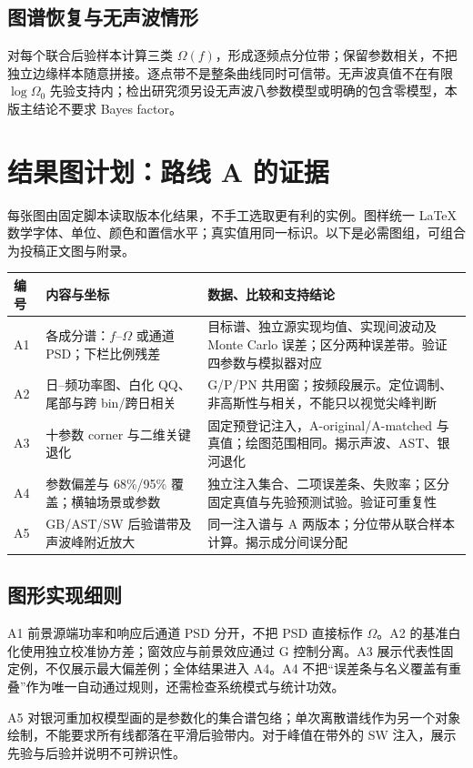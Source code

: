 \documentclass[UTF8,fontset=none,a4paper,11pt]{ctexart}
\newcommand{\chapterpage}[1]{\section{#1}}
\begin{document}
\subsection{图谱恢复与无声波情形}
对每个联合后验样本计算三类 $\Omega(f)$，形成逐频点分位带；保留参数相关，不把独立边缘样本随意拼接。逐点带不是整条曲线同时可信带。无声波真值不在有限 $\log\Omega_0$ 先验支持内；检出研究须另设无声波八参数模型或明确的包含零模型，本版主结论不要求 Bayes factor。
\chapterpage{结果图计划：路线 A 的证据}
每张图由固定脚本读取版本化结果，不手工选取更有利的实例。图样统一 LaTeX 数学字体、单位、颜色和置信水平；真实值用同一标识。以下是必需图组，可组合为投稿正文图与附录。
\begin{longtable}{p{12mm}p{58mm}p{75mm}}\toprule
编号 & 内容与坐标 & 数据、比较和支持结论\\\midrule\endhead
A1 & 各成分谱：$f$--$\Omega$ 或通道 PSD；下栏比例残差 & 目标谱、独立源实现均值、实现间波动及 Monte Carlo 误差；区分两种误差带。验证四参数与模拟器对应\\
A2 & 日--频功率图、白化 QQ、尾部与跨 bin/跨日相关 & G/P/PN 共用窗；按频段展示。定位调制、非高斯性与相关，不能只以视觉尖峰判断\\
A3 & 十参数 corner 与二维关键退化 & 固定预登记注入，A-original/A-matched 与真值；绘图范围相同。揭示声波、AST、银河退化\\
A4 & 参数偏差与 68\%/95\% 覆盖；横轴场景或参数 & 独立注入集合、二项误差条、失败率；区分固定真值与先验预测试验。验证可重复性\\
A5 & GB/AST/SW 后验谱带及声波峰附近放大 & 同一注入谱与 A 两版本；分位带从联合样本计算。揭示成分间误分配\\\bottomrule
\end{longtable}
\subsection{图形实现细则}
A1 前景源端功率和响应后通道 PSD 分开，不把 PSD 直接标作 $\Omega$。A2 的基准白化使用独立校准协方差；窗效应与前景效应通过 G 控制分离。A3 展示代表性固定例，不仅展示最大偏差例；全体结果进入 A4。A4 不把“误差条与名义覆盖有重叠”作为唯一自动通过规则，还需检查系统模式与统计功效。
\par A5 对银河重加权模型画的是参数化的集合谱包络；单次离散谱线作为另一个对象绘制，不能要求所有线都落在平滑后验带内。对于峰值在带外的 SW 注入，展示先验与后验并说明不可辨识性。
\end{document}
